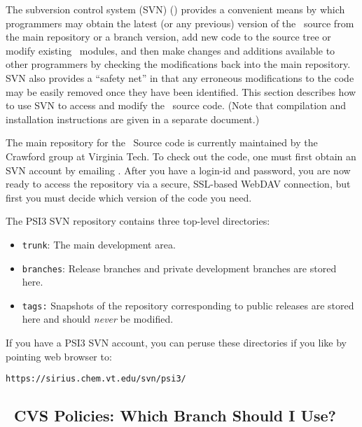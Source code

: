 %
%
%
%

The subversion control system (SVN) () provides a
convenient means by which programmers may obtain the latest (or any
previous) version of the \PSIthree\ source from the main repository or
a branch version, add new code to the source tree or modify existing
\PSIthree\ modules, and then make changes and additions available to
other programmers by checking the modifications back into the main
repository.  SVN also provides a ``safety net'' in that any erroneous
modifications to the code may be easily removed once they have been
identified.  This section describes how to use SVN to access and
modify the \PSIthree\ source code.  (Note that compilation and
installation instructions are given in a separate document.)

The main repository for the \PSIthree\ Source code is currently
maintained by the Crawford group at Virginia Tech.  To check out the
code, one must first obtain an SVN account by emailing
.
After you have a login-id and password, you are now ready to access
the repository via a secure, SSL-based WebDAV connection, but first
you must decide which version of the code you need.

The PSI3 SVN repository contains three top-level directories:
\begin{itemize}
\item {\tt trunk}: The main development area.
\item {\tt branches}: Release branches and private development
  branches are stored here.
\item {\tt tags:} Snapshots of the repository corresponding to public
  releases are stored here and should {\em never} be modified.
\end{itemize}
If you have a PSI3 SVN account, you can peruse these directories if
you like by pointing web browser to:

\noindent
{\tt https://sirius.chem.vt.edu/svn/psi3/}

\subsection{\PSIthree\ CVS Policies: Which Branch Should I Use?}
\label{section:branches}

